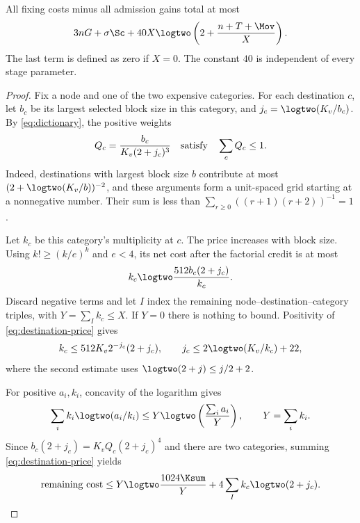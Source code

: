 \begin{lemma}
\label{lem:net}
All fixing costs minus all admission gains total at most
\begin{equation}
 3nG+\sigma\Sc+
 40X\logtwo\left(2+\frac{n+T+\Mov}{X}\right).
\label{eq:net}
\end{equation}
The last term is defined as zero if $X=0$. The constant $40$ is independent
of every stage parameter.
\end{lemma}
\begin{proof}
Fix a node and one of the two expensive categories. For each destination
$c$, let $b_c$ be its largest selected block size in this category, and
$j_c=\logtwo(K_v/b_c)$. By \eqref{eq:dictionary}, the positive weights
\[
                 Q_c=\frac{b_c}{K_v(2+j_c)^3}
                 \quad\hbox{satisfy}\quad \sum_c Q_c\leq1.
\]
Indeed, destinations with largest block size $b$ contribute at most
$(2+\logtwo(K_v/b))^{-2}$, and these arguments form a unit-spaced grid
starting at a nonnegative number. Their sum is less than
$\sum_{r\geq0}((r+1)(r+2))^{-1}=1$.

Let $k_c$ be this category's multiplicity at $c$.
The price increases with block size. Using
$k!\geq(k/e)^k$ and $e<4$, its net cost after the factorial credit is at most
\begin{equation}
                       k_c\logtwo\frac{512b_c(2+j_c)}{k_c}.
\label{eq:destination-price}
\end{equation}
Discard negative terms and let $I$ index the remaining
node--destination--category triples, with $Y=\sum_I k_c\leq X$.
If $Y=0$ there is nothing to bound. Positivity of
\eqref{eq:destination-price} gives
\[
 k_c\leq512K_v2^{-j_c}(2+j_c),\qquad
 j_c\leq2\logtwo(K_v/k_c)+22,
\]
where the second estimate uses $\logtwo(2+j)\leq j/2+2$.

For positive $a_i,k_i$, concavity of the logarithm gives
\begin{equation}
             \sum_i k_i\logtwo(a_i/k_i)
             \leq Y\logtwo\left(\frac{\sum_i a_i}{Y}\right),
             \qquad Y=\sum_i k_i .
\label{eq:logsum}
\end{equation}
Since $b_c(2+j_c)=K_vQ_c(2+j_c)^4$ and there are two categories,
summing \eqref{eq:destination-price} yields
\begin{equation}
  \text{remaining cost}\leq
  Y\logtwo\frac{1024\Ksum}{Y}+4\sum_I k_c\logtwo(2+j_c).
\label{eq:price-sum}
\end{equation}


\end{proof}
